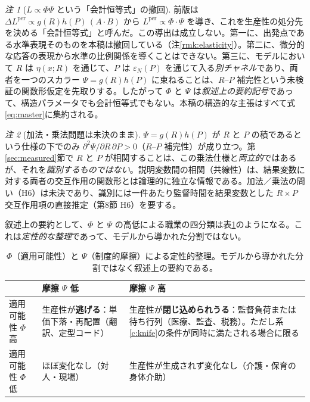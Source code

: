 \documentclass[11pt]{article}
\theoremstyle{plain}
\theoremstyle{definition}
\theoremstyle{remark}
\newtheorem*{rmk}{注}
\begin{document}
\begin{rmk}[$L\propto\Phi\Psi$ という「会計恒等式」の撤回]\label{rmk:phipsi}
前版は $\Delta L^{\text{per}}\propto g(R)h(P)\,(A\cdot B)$ から $L^{\text{per}}\propto\Phi\cdot\Psi$ を導き、これを生産性の処分先を決める「会計恒等式」と呼んだ。この導出は成立しない。第一に、出発点である水準表現そのものを本稿は撤回している（注\ref{rmk:elasticity}）。第二に、微分的な応答の表現から水準の比例関係を導くことはできない。第三に、モデルにおいて $R$ は $\eta(x;R)$ を通じて、$P$ は $\varepsilon_N(P)$ を通じて入る\emph{別チャネル}であり、両者を一つのスカラー $\Psi=g(R)h(P)$ に束ねることは、$R$--$P$ 補完性という未検証の関数形仮定を先取りする。したがって $\Phi$ と $\Psi$ は\emph{叙述上の要約記号}であって、構造パラメータでも会計恒等式でもない。本稿の構造的な主張はすべて式\eqref{eq:master}に集約される。
\end{rmk}

\begin{rmk}[加法・乗法問題は未決のまま]\label{p:mult}
$\Psi=g(R)h(P)$ が $R$ と $P$ の積であるという仕様の下でのみ $\partial^2\Psi/\partial R\,\partial P>0$（$R$--$P$ 補完性）が成り立つ。第\ref{sec:measured}節で $R$ と $P$ が相関することは、この乗法仕様と\emph{両立的}ではあるが、それを\emph{識別するものではない}。説明変数間の相関（共線性）は、結果変数に対する両者の交互作用の関数形とは論理的に独立な情報である。加法／乗法の問い（H6）は未決であり、識別には一件あたり監督時間を結果変数とした $R\times P$ 交互作用項の直接推定（第8節 H6）を要する。
\end{rmk}

叙述上の要約として、$\Phi$ と $\Psi$ の高低による職業の四分類は表\ref{tab:phipsi}のようになる。これは\emph{定性的な整理}であって、モデルから導かれた分割ではない。

\begin{table}[h]\centering\small
\caption{$\Phi$（適用可能性）と $\Psi$（制度的摩擦）による定性的整理。モデルから導かれた分割ではなく叙述上の要約である。}\label{tab:phipsi}
\begin{tabularx}{\textwidth}{@{}lXX@{}}
\toprule
 & 摩擦 $\Psi$ 低 & 摩擦 $\Psi$ 高 \\ \midrule
適用可能性 $\Phi$ 高 & 生産性が\textbf{逃げる}：単価下落・再配置（翻訳、定型コード） & 生産性が\textbf{閉じ込められうる}：監督負荷または待ち行列（医療、監査、税務）。ただし系\ref{c:knife}の条件が同時に満たされる場合に限る \\[2pt]
適用可能性 $\Phi$ 低 & ほぼ変化なし（対人・現場） & 生産性が生成されず変化なし（介護・保育の身体介助） \\
\bottomrule
\end{tabularx}
\end{table}
\end{document}
